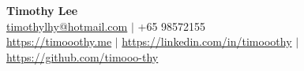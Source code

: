 \documentclass[11pt,letterpaper]{article}
\begin{document}
\newcommand{\ressubheadingfirst}[4]{
    \vspace{-6pt}
    \begin{tabular*}{\textwidth}{l@{\extracolsep{\fill}}r}
        \small \textbf{#1} & \small #2 \\
        \small \textit{#3} & \small \textit{#4} \\
    \end{tabular*}\vspace{-3pt}}

\newenvironment{leftitemize}{%
  \begin{list}{--}{%
    \setlength{\leftmargin}{0pt}%
    \setlength{\itemindent}{0pt}%
    \setlength{\labelsep}{0.5em}%
    \setlength{\labelwidth}{0.5em}%
  }%
}{%
  \end{list}%
}

\newenvironment{subitemize}{%
  \begin{list}{--}{%
    \setlength{\leftmargin}{18pt}%
    \setlength{\itemindent}{0pt}%
    \setlength{\labelsep}{0.5em}%
    \setlength{\labelwidth}{0.5em}%
  }%
}{%
  \end{list}%
}

\newcommand{\resprojectfirst}[2]{
    \vspace{-2pt}
    \begin{tabular*}{\textwidth}{l@{\extracolsep{\fill}}r}
        \small \textbf{#1} & \small #2 \\
    \end{tabular*}\vspace{-2pt}}

\newcommand{\resproject}[2]{
    \vspace{2pt}
    \begin{tabular*}{\textwidth}{l@{\extracolsep{\fill}}r}
        \small \textbf{#1} & \small #2 \\
    \end{tabular*}\vspace{-2pt}}

\begin{center}
{\Large \textbf{Timothy Lee}}\\
\vspace{2pt}
\small \href{mailto:timothylhy@hotmail.com}{timothylhy@hotmail.com} $|$ +65 98572155\\
\small \href{https://timooothy.me}{https://timooothy.me} $|$ \href{https://linkedin.com/in/timooothy}{https://linkedin.com/in/timooothy} $|$ \href{https://github.com/timooo-thy}{https://github.com/timooo-thy}
\end{center}
\vspace{3pt}
\end{document}
